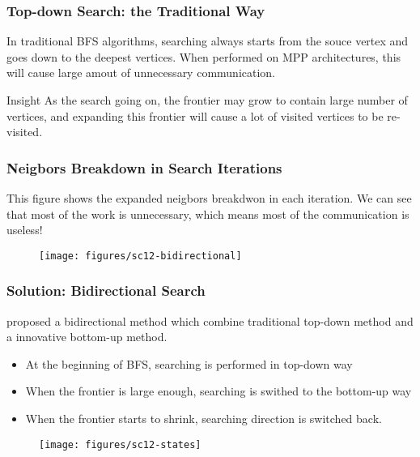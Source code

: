 \documentclass[]{beamer}
\begin{document}
\begin{frame}
  \frametitle{Top-down Search: the Traditional Way}
  In traditional BFS algorithms, searching always starts from the souce vertex
  and goes down to the deepest vertices. When performed on MPP architectures,
  this will cause large amout of unnecessary communication.
  \begin{block}{Insight}
    As the search going on, the frontier may grow to contain large number of vertices,
    and expanding this frontier will cause a lot of visited vertices to be re-visited.
  \end{block}
\end{frame}

\begin{frame}
  \frametitle{Neigbors Breakdown in Search Iterations}
  This figure shows the expanded neigbors breakdwon in each iteration.
  We can see that most of the work is unnecessary, which means most of
  the communication is useless!
  \begin{figure}
    \texttt{[image: figures/sc12-bidirectional]}
  \end{figure}
\end{frame}

\begin{frame}
  \frametitle{Solution: Bidirectional Search}
  \cite{Beamer2012} proposed a bidirectional method which combine traditional top-down
  method and a innovative bottom-up method.
  \begin{itemize}
    \item At the beginning of BFS, searching is performed in top-down way
    \item When the frontier is large enough, searching is swithed to the bottom-up way
    \item When the frontier starts to shrink, searching direction is switched back.
  \end{itemize}
  \begin{figure}
    \texttt{[image: figures/sc12-states]}
  \end{figure}
\end{frame}


\end{document}

